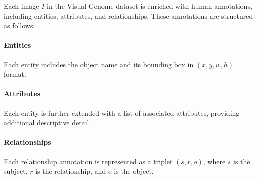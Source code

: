 


Each image $I$ in the Visual Genome dataset is enriched with human annotations, including entities, attributes, and relationships. These annotations are structured as follows:

\vspace{-5pt}
\paragraph{Entities} Each entity includes the object name and its bounding box in  $(x, y, w, h)$ format.
\vspace{-5pt}
\paragraph{Attributes} Each entity is further extended with a list of associated attributes, providing additional descriptive detail.
\vspace{-5pt}
\paragraph{Relationships} Each relationship annotation is represented as a triplet $(s,r,o)$, where $s$ is the subject, $r$ is the relationship, and $o$ is the object.

